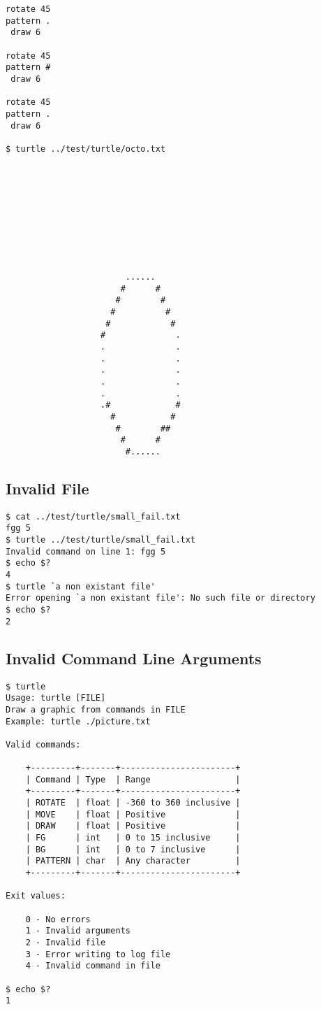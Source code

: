\documentclass[a4paper, 12pt, titlepage]{article}
\begin{document}
\begin{lstlisting}
rotate 45
pattern .
 draw 6

rotate 45
pattern #
 draw 6

rotate 45
pattern .
 draw 6

$ turtle ../test/turtle/octo.txt










                        ......
                       #      #
                      #        #
                     #          #
                    #            #
                   #              .
                   .              .
                   .              .
                   .              .
                   .              .
                   .              .
                   .#             #
                     #           #
                      #        ##
                       #      #
                        #......
\end{lstlisting}

\subsection{Invalid File}

\begin{lstlisting}
$ cat ../test/turtle/small_fail.txt
fgg 5
$ turtle ../test/turtle/small_fail.txt
Invalid command on line 1: fgg 5
$ echo $?
4
$ turtle `a non existant file'
Error opening `a non existant file': No such file or directory
$ echo $?
2
\end{lstlisting}

\pagebreak
\subsection{Invalid Command Line Arguments}

\begin{lstlisting}
$ turtle
Usage: turtle [FILE]
Draw a graphic from commands in FILE
Example: turtle ./picture.txt

Valid commands:

    +---------+-------+-----------------------+
    | Command | Type  | Range                 |
    +---------+-------+-----------------------+
    | ROTATE  | float | -360 to 360 inclusive |
    | MOVE    | float | Positive              |
    | DRAW    | float | Positive              |
    | FG      | int   | 0 to 15 inclusive     |
    | BG      | int   | 0 to 7 inclusive      |
    | PATTERN | char  | Any character         |
    +---------+-------+-----------------------+

Exit values:

    0 - No errors
    1 - Invalid arguments
    2 - Invalid file
    3 - Error writing to log file
    4 - Invalid command in file

$ echo $?
1
\end{lstlisting}

\newpage
\end{document}

